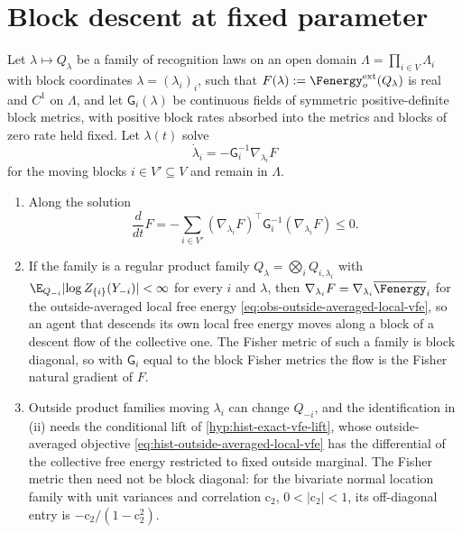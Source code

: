 \section{Block descent at fixed parameter}
\label{sec:local-natural-gradient}

Let $\lambda\mapsto Q_\lambda$ be a family of recognition laws on an open domain
$\Lambda=\prod_{i\in V}\Lambda_i$ with block coordinates $\lambda=(\lambda_i)_i$,
such that $F(\lambda):=\Fenergy^{\mathrm{ext}}_o(Q_\lambda)$ is real and $C^1$ on
$\Lambda$, and let $\mathsf G_i(\lambda)$ be continuous fields of symmetric
positive-definite block metrics, with positive block rates absorbed into the
metrics and blocks of zero rate held fixed. Let $\lambda(t)$ solve
\begin{equation}
\dot\lambda_i=-\mathsf G_i^{-1}\nabla_{\lambda_i}F
\label{eq:obs-local-natural-gradient}
\end{equation}
for the moving blocks $i\in V'\subseteq V$ and remain in $\Lambda$.
\begin{enumerate}
\item[(i)] Along the solution
\begin{equation}
\frac{d}{dt}F=-\sum_{i\in V'}(\nabla_{\lambda_i}F)^\top\mathsf G_i^{-1}(\nabla_{\lambda_i}F)\leq0.
\label{eq:obs-global-dissipation}
\end{equation}
\item[(ii)] If the family is a regular product family
$Q_\lambda=\bigotimes_iQ_{i,\lambda_i}$ with
$\E_{Q_{-i}}\lvert\log Z_{\{i\}}(Y_{-i})\rvert<\infty$ for every $i$ and $\lambda$,
then $\nabla_{\lambda_i}F=\nabla_{\lambda_i}\overline\Fenergy_i$ for the
outside-averaged local free energy \eqref{eq:obs-outside-averaged-local-vfe}, so
an agent that descends its own local free energy moves along a block of a
descent flow of the collective one. The Fisher metric of such a family is block
diagonal, so with $\mathsf G_i$ equal to the block Fisher metrics the flow is the
Fisher natural gradient of $F$.
\item[(iii)] Outside product families moving $\lambda_i$ can change $Q_{-i}$,
and the identification in (ii) needs the conditional lift of
\cref{hyp:hist-exact-vfe-lift}, whose outside-averaged objective
\eqref{eq:hist-outside-averaged-local-vfe} has the differential of the collective
free energy restricted to fixed outside marginal. The Fisher metric then need not
be block diagonal: for the bivariate normal location family with unit variances
and correlation $\mathrm c_2$, $0<\lvert\mathrm c_2\rvert<1$, its off-diagonal entry
is $-\mathrm c_2/(1-\mathrm c_2^2)$.
\end{enumerate}

